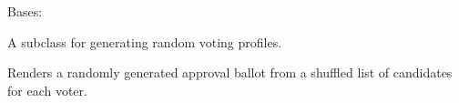 \documentclass[letterpaper,10pt,english]{sphinxmanual}
\begin{document}

\begin{fulllineitems}
\label{techDoc:votingDigraphs.RandomVotingProfile}
Bases: {\hyperref[techDoc:votingDigraphs.VotingProfile]{\emph{}}}

A subclass for generating random voting profiles.

\begin{fulllineitems}
\label{techDoc:votingDigraphs.RandomVotingProfile.generateRandomBallot}
Renders a randomly generated approval ballot
from a shuffled list of candidates for each voter.

\end{fulllineitems}


\end{fulllineitems}

\end{document}
